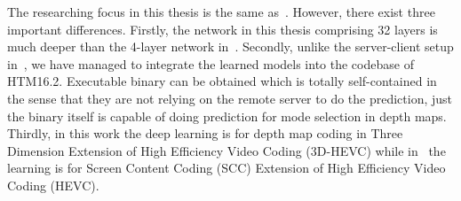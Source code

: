 The researching focus in this thesis is the same as~\parencite{RN73}.
However, there exist three important differences.
Firstly, the network in this thesis comprising 32 layers is
much deeper than the 4-layer network in~\parencite{RN73}.
Secondly, unlike the server-client setup in~\parencite{RN73}, we have
managed to integrate the learned models into the codebase of HTM16.2.
Executable binary can be obtained which is totally self-contained in the
sense that they are not relying on the remote server to do the prediction,
just the binary itself is capable of doing prediction
for mode selection in depth maps.
Thirdly, in this work the deep learning is for depth map coding in
Three Dimension Extension of High Efficiency Video Coding (3D-HEVC)
while in~\parencite{RN73} the learning is for Screen Content Coding (SCC)
Extension of High Efficiency Video Coding (HEVC).





